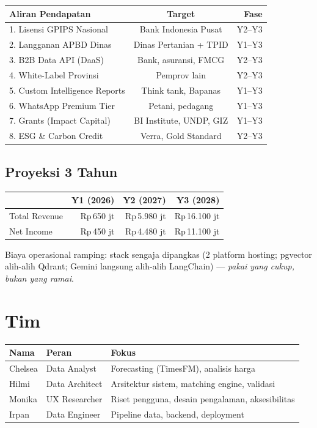 \documentclass[11pt,a4paper]{article}
\newcommand{\rp}{Rp\,}
\begin{document}
\begin{center}
\begin{tabular}{lcr}
\toprule
\textbf{Aliran Pendapatan} & \textbf{Target} & \textbf{Fase} \\
\midrule
1. Lisensi GPIPS Nasional & Bank Indonesia Pusat & Y2--Y3 \\
2. Langganan APBD Dinas & Dinas Pertanian + TPID & Y1--Y3 \\
3. B2B Data API (DaaS) & Bank, asuransi, FMCG & Y2--Y3 \\
4. White-Label Provinsi & Pemprov lain & Y2--Y3 \\
5. Custom Intelligence Reports & Think tank, Bapanas & Y1--Y3 \\
6. WhatsApp Premium Tier & Petani, pedagang & Y1--Y3 \\
7. Grants (Impact Capital) & BI Institute, UNDP, GIZ & Y1--Y3 \\
8. ESG \& Carbon Credit & Verra, Gold Standard & Y2--Y3 \\
\bottomrule
\end{tabular}
\end{center}

\subsection{Proyeksi 3 Tahun}
\begin{center}
\begin{tabular}{lrrr}
\toprule
& \textbf{Y1 (2026)} & \textbf{Y2 (2027)} & \textbf{Y3 (2028)} \\
\midrule
Total Revenue & \rp 650 jt & \rp 5.980 jt & \rp 16.100 jt \\
Net Income & \rp 450 jt & \rp 4.480 jt & \rp 11.100 jt \\
\bottomrule
\end{tabular}
\end{center}

\noindent Biaya operasional ramping: stack sengaja dipangkas (2 platform hosting; pgvector
alih-alih Qdrant; Gemini langsung alih-alih LangChain) --- \emph{pakai yang cukup, bukan yang
ramai}.

\section{Tim}
\begin{center}
\begin{tabular}{lll}
\toprule
\textbf{Nama} & \textbf{Peran} & \textbf{Fokus} \\
\midrule
Chelsea & Data Analyst & Forecasting (TimesFM), analisis harga \\
Hilmi & Data Architect & Arsitektur sistem, matching engine, validasi \\
Monika & UX Researcher & Riset pengguna, desain pengalaman, aksesibilitas \\
Irpan & Data Engineer & Pipeline data, backend, deployment \\
\bottomrule
\end{tabular}
\end{center}
\end{document}
